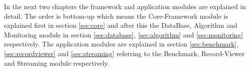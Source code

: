 In the next two chapters the framework and application modules are explained in detail. The order is bottom-up which means the Core-Framework module is explained first in section \ref{sec:core} and after this the DataBase, Algorithm and Monitoring module in section \ref{sec:database}, \ref{sec:algorithm} and \ref{sec:monitoring} respectively. The application modules are explained in section \ref{sec:benchmark}, \ref{sec:recordviewer} and \ref{sec:streaming} referring to the Benchmark, Record-Viewer and Streaming module respectively.